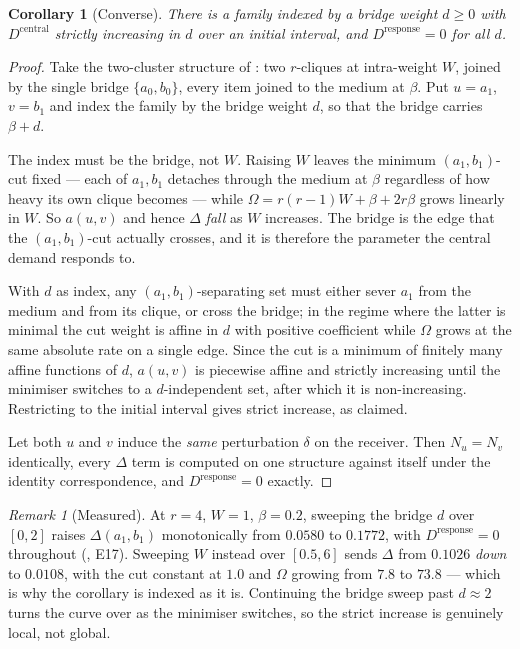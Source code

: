\documentclass[11pt,twocolumn,a4paper]{article}
\theoremstyle{plain}
\newtheorem{corollary}[theorem]{Corollary}
\theoremstyle{definition}
\theoremstyle{remark}
\newtheorem{remark}[theorem]{Remark}
\newcommand{\flo}{\beta}                       %
\newcommand{\Om}{\Omega}
\newcommand{\dem}{D}
\begin{document}
\begin{corollary}[Converse]
\label{cor:converse}
There is a family indexed by a bridge weight $d\ge0$ with
$\dem^{\mathrm{central}}$ strictly increasing in $d$ over an initial
interval, and $\dem^{\mathrm{response}}=0$ for all $d$.
\end{corollary}

\begin{proof}
Take the two-cluster structure of : two $r$-cliques at
intra-weight $W$, joined by the single bridge $\{a_0,b_0\}$, every item
joined to the medium at $\flo$. Put $u=a_1$, $v=b_1$ and index the
family by the bridge weight $d$, so that the bridge carries $\flo+d$.

The index must be the bridge, not $W$. Raising $W$ leaves the minimum
$(a_1,b_1)$-cut fixed --- each of $a_1,b_1$ detaches through the medium
at $\flo$ regardless of how heavy its own clique becomes --- while
$\Om=r(r-1)W+\flo+2r\flo$ grows linearly in $W$. So $a(u,v)$ and hence
$\Delta$ \emph{fall} as $W$ increases. The bridge is the edge that the
$(a_1,b_1)$-cut actually crosses, and it is therefore the parameter the
central demand responds to.

With $d$ as index, any $(a_1,b_1)$-separating set must either sever
$a_1$ from the medium and from its clique, or cross the bridge; in the
regime where the latter is minimal the cut weight is affine in $d$ with
positive coefficient while $\Om$ grows at the same absolute rate on a
single edge. Since the cut is a minimum of finitely many affine
functions of $d$, $a(u,v)$ is piecewise affine and strictly increasing
until the minimiser switches to a $d$-independent set, after which it
is non-increasing. Restricting to the initial interval gives strict
increase, as claimed.

Let both $u$ and $v$ induce the \emph{same} perturbation $\delta$ on the
receiver. Then $N_u=N_v$ identically, every $\Delta$ term is computed on
one structure against itself under the identity correspondence, and
$\dem^{\mathrm{response}}=0$ exactly.
\end{proof}

\begin{remark}[Measured]
\label{rem:convmeasured}
At $r=4$, $W=1$, $\flo=0.2$, sweeping the bridge $d$ over $[0,2]$ raises
$\Delta(a_1,b_1)$ monotonically from $0.0580$ to $0.1772$, with
$\dem^{\mathrm{response}}=0$ throughout (, E17).
Sweeping $W$ instead over $[0.5,6]$ sends $\Delta$ from $0.1026$
\emph{down} to $0.0108$, with the cut constant at $1.0$ and $\Om$
growing from $7.8$ to $73.8$ --- which is why the corollary is indexed
as it is. Continuing the bridge sweep past $d\approx2$ turns the curve
over as the minimiser switches, so the strict increase is genuinely
local, not global.
\end{remark}
\end{document}
